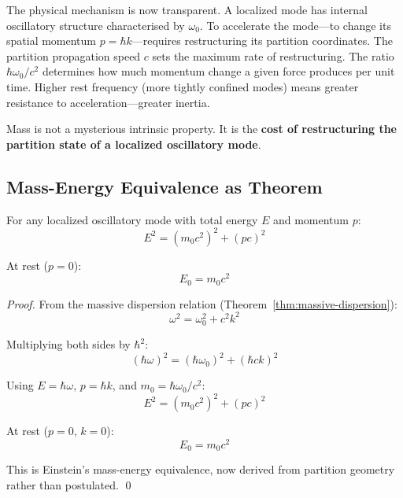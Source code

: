 \begin{remark}
The physical mechanism is now transparent. A localized mode has internal oscillatory structure characterised by $\omega_0$. To accelerate the mode---to change its spatial momentum $p = \hbar k$---requires restructuring its partition coordinates. The partition propagation speed $c$ sets the maximum rate of restructuring. The ratio $\hbar\omega_0/c^2$ determines how much momentum change a given force produces per unit time. Higher rest frequency (more tightly confined modes) means greater resistance to acceleration---greater inertia.

Mass is not a mysterious intrinsic property. It is the \textbf{cost of restructuring the partition state of a localized oscillatory mode}.
\end{remark}

\subsection{Mass-Energy Equivalence as Theorem}

\begin{theorem}
\label{thm:mass-energy-equivalence}
For any localized oscillatory mode with total energy $E$ and momentum $p$:
\begin{equation}
    E^2 = (m_0 c^2)^2 + (pc)^2
    \label{eq:energy-momentum}
\end{equation}

At rest ($p = 0$):
\begin{equation}
    E_0 = m_0 c^2
    \label{eq:e-mc2}
\end{equation}
\end{theorem}

\begin{proof}
From the massive dispersion relation (Theorem~\ref{thm:massive-dispersion}):
\begin{equation}
    \omega^2 = \omega_0^2 + c^2 k^2
\end{equation}

Multiplying both sides by $\hbar^2$:
\begin{equation}
    (\hbar\omega)^2 = (\hbar\omega_0)^2 + (\hbar c k)^2
\end{equation}

Using $E = \hbar\omega$, $p = \hbar k$, and $m_0 = \hbar\omega_0/c^2$:
\begin{equation}
    E^2 = (m_0 c^2)^2 + (pc)^2
\end{equation}

At rest ($p = 0$, $k = 0$):
\begin{equation}
    E_0 = m_0 c^2
\end{equation}

This is Einstein's mass-energy equivalence, now derived from partition geometry rather than postulated. \qed
\end{proof}

